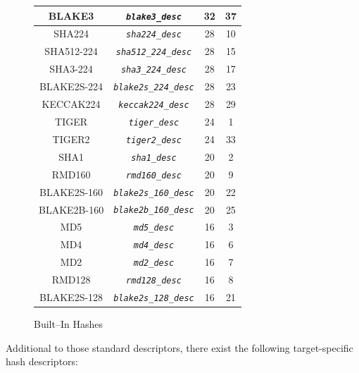 \documentclass[synpaper]{book}
\newcommand{\code}[1]{\texttt{\textit{#1}}}
\begin{document}
\begin{figure}[H]
\begin{center}
\begin{tabular}{|c|c|c|c|}
\hline BLAKE3            & \code{blake3\_desc}              & 32 & 37 \\
\hline SHA224            & \code{sha224\_desc}              & 28 & 10 \\
\hline SHA512-224        & \code{sha512\_224\_desc}         & 28 & 15 \\
\hline SHA3-224          & \code{sha3\_224\_desc}           & 28 & 17 \\
\hline BLAKE2S-224       & \code{blake2s\_224\_desc}        & 28 & 23 \\
\hline KECCAK224         & \code{keccak224\_desc}           & 28 & 29 \\
\hline TIGER             & \code{tiger\_desc}               & 24 &  1 \\
\hline TIGER2            & \code{tiger2\_desc}              & 24 & 33 \\
\hline SHA1              & \code{sha1\_desc}                & 20 &  2 \\
\hline RMD160            & \code{rmd160\_desc}              & 20 &  9 \\
\hline BLAKE2S-160       & \code{blake2s\_160\_desc}        & 20 & 22 \\
\hline BLAKE2B-160       & \code{blake2b\_160\_desc}        & 20 & 25 \\
\hline MD5               & \code{md5\_desc}                 & 16 &  3 \\
\hline MD4               & \code{md4\_desc}                 & 16 &  6 \\
\hline MD2               & \code{md2\_desc}                 & 16 &  7 \\
\hline RMD128            & \code{rmd128\_desc}              & 16 &  8 \\
\hline BLAKE2S-128       & \code{blake2s\_128\_desc}        & 16 & 21 \\

\hline
\end{tabular}
\end{center}
\caption{Built--In Hashes}
\end{figure}

Additional to those standard descriptors, there exist the following target-specific hash descriptors:
\end{document}
